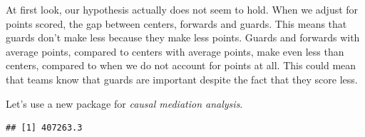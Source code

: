 \documentclass[
]{book}
\newenvironment{Shaded}{\begin{snugshade}}{\end{snugshade}}
\newcommand{\AttributeTok}[1]{\textcolor[rgb]{0.13,0.29,0.53}{#1}}
\newcommand{\CommentTok}[1]{\textcolor[rgb]{0.56,0.35,0.01}{\textit{#1}}}
\newcommand{\DecValTok}[1]{\textcolor[rgb]{0.00,0.00,0.81}{#1}}
\newcommand{\FunctionTok}[1]{\textcolor[rgb]{0.13,0.29,0.53}{\textbf{#1}}}
\newcommand{\NormalTok}[1]{#1}
\newcommand{\OtherTok}[1]{\textcolor[rgb]{0.56,0.35,0.01}{#1}}
\newcommand{\SpecialCharTok}[1]{\textcolor[rgb]{0.81,0.36,0.00}{\textbf{#1}}}
\begin{document}
At first look, our hypothesis actually does not seem to hold. When we adjust for
points scored, the gap between centers, forwards and guards. This means that
guards don't make less because they make less points. Guards and forwards with
average points, compared to centers with average points, make even less than centers, compared to when we do not account for points at all. This could mean that teams know that guards
are important despite the fact that they score less.

Let's use a new package for \emph{causal mediation analysis}.

\begin{Shaded}
\end{Shaded}

\begin{verbatim}
## [1] 407263.3
\end{verbatim}
\end{document}
